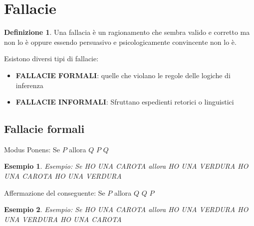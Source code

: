 \documentclass{article}
\newtheorem{exmp}{Esempio}[section]
\theoremstyle{definition}
\newtheorem{definition}{Definizione}[section]
\begin{document}
\newpage
\section{Fallacie}\label{sec:fallacie}
\begin{definition}
        Una fallacia è un ragionamento che sembra valido e corretto ma non lo è oppure essendo persuasivo e psicologicamente convincente non lo è. \par
\end{definition}

Esistono diversi tipi di fallacie:
\begin{itemize}
        \item \textbf{FALLACIE FORMALI}: quelle che violano le regole delle logiche di inferenza 
        \item \textbf{FALLACIE INFORMALI}: Sfruttano espedienti retorici o linguistici 
\end{itemize}

\subsection{Fallacie formali}
\begin{tcolorbox}
        Modus Ponens: \newline 
        Se $ P $ allora $ Q $ \newline
        $ P $ \newline
        $ Q $ \newline 
\end{tcolorbox} 
\begin{exmp}
        Esempio: \newline
        Se HO UNA CAROTA allora HO UNA VERDURA \newline
        HO UNA CAROTA \newline
        HO UNA VERDURA \newline 
\end{exmp}

\begin{tcolorbox}
        Affermazione del conseguente: \newline
        Se $ P $ allora $ Q $ \newline
        $ Q $ \newline
        $ P $ \newline 
\end{tcolorbox}
\begin{exmp}
        Esempio: \newline
        Se HO UNA CAROTA allora HO UNA VERDURA \newline
        HO UNA VERDURA \newline 
        HO UNA CAROTA \newline
\end{exmp}
\end{document}

